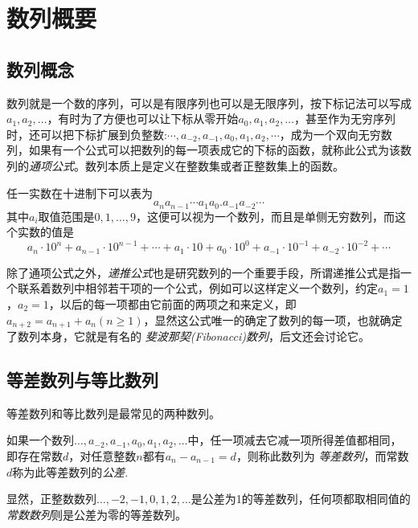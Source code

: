 
\section{数列概要}
\label{sec:number-sequence-general}

\subsection{数列概念}

数列就是一个数的序列，可以是有限序列也可以是无限序列，按下标记法可以写成$a_1,a_2,\ldots$，有时为了方便也可以让下标从零开始$a_0,a_1,a_2,\ldots$，甚至作为无穷序列时，还可以把下标扩展到负整数:$\cdots,a_{-2},a_{-1},a_0,a_1,a_2,\cdots$，成为一个双向无穷数列，如果有一个公式可以把数列的每一项表成它的下标的函数，就称此公式为该数列的\emph{通项公式}。数列本质上是定义在整数集或者正整数集上的函数。

\begin{example}
  任一实数在十进制下可以表为
  \[ a_na_{n-1}\cdots a_1a_0.a_{-1}a_{-2}\cdots \]
  其中$a_i$取值范围是$0,1,\ldots,9$，这便可以视为一个数列，而且是单侧无穷数列，而这个实数的值是
  \[ a_n\cdot 10^n + a_{n-1} \cdot 10^{n-1} + \cdots + a_1 \cdot 10 + a_0 \cdot 10^0 + a_{-1} \cdot 10^{-1} + a_{-2} \cdot 10^{-2} +\cdots \]
\end{example}

除了通项公式之外，\emph{递推公式}也是研究数列的一个重要手段，所谓递推公式是指一个联系着数列中相邻若干项的一个公式，例如可以这样定义一个数列，约定$a_1=1$，$a_2=1$，以后的每一项都由它前面的两项之和来定义，即$a_{n+2}=a_{n+1}+a_n(n \geqslant 1)$，显然这公式唯一的确定了数列的每一项，也就确定了数列本身，它就是有名的 \emph{斐波那契(Fibonacci)数列}，后文还会讨论它。

\subsection{等差数列与等比数列}

等差数列和等比数列是最常见的两种数列。

\begin{definition}
 如果一个数列$\ldots,a_{-2},a_{-1},a_0,a_1,a_2,\ldots$中，任一项减去它减一项所得差值都相同，即存在常数$d$，对任意整数$n$都有$a_n-a_{n-1}=d$，则称此数列为 \emph{等差数列}，而常数$d$称为此等差数列的\emph{公差}.
\end{definition}

显然，正整数数列$\ldots,-2,-1,0,1,2,\ldots$是公差为1的等差数列，任何项都取相同值的\emph{常数数列}则是公差为零的等差数列。

